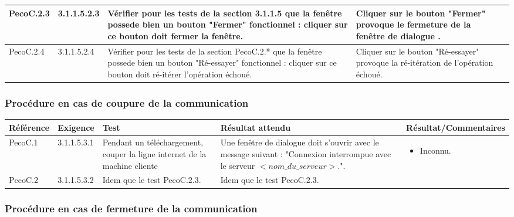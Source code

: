 \documentclass[10pt,a4paper,landscape]{report}
\begin{document}
\begin{center}
\begin{tabular}{|p{2.5cm}|p{2cm}|p{8cm}|p{8cm}|p{5cm}|}
		PecoC.2.3 & 3.1.1.5.2.3 & Vérifier pour les tests de la section 3.1.1.5 que la fenêtre possede bien un bouton "Fermer" fonctionnel :  cliquer sur ce bouton doit fermer la fenêtre.& Cliquer sur le bouton "Fermer" provoque le fermeture de la fenêtre de dialogue .&\\
		\hline
		PecoC.2.4 & 3.1.1.5.2.4 & Vérifier pour les tests de la section PecoC.2.* que la fenêtre possede bien un bouton "Ré-essayer" fonctionnel :  cliquer sur ce bouton doit ré-itérer l'opération échoué.& Cliquer sur le bouton "Ré-essayer" provoque la ré-itération de l'opération échoué.&\\
		\hline
	\end{tabular}
	\egroup
\end{center}

\subsubsection{Procédure en cas de coupure de la communication}

\begin{center}
	\bgroup
	\def\arraystretch{1.5}
	\begin{tabular}{|p{2.5cm}|p{2cm}|p{8cm}|p{8cm}|p{5cm}|}
		\hline
		\rowcolor{gris}Référence & Exigence & Test & Résultat attendu & Résultat/Commentaires\\
		\hline
		PecoC.1 & 3.1.1.5.3.1 & Pendant un téléchargement, couper la ligne internet de la machine cliente & Une fenêtre de dialogue doit s'ouvrir avec le message suivant :   "Connexion interrompue avec le serveur $< nom\_du\_serveur>$.".&\vspace*{-0.2cm} \begin{itemize}[label=$\ast$] \item \textcolor{ukwn}{Inconnu.}\end{itemize} \\
		\hline
		PccoC.2 & 3.1.1.5.3.2 & Idem que le test PecoC.2.3. & Idem que le test PecoC.2.3.\\
		\hline
	\end{tabular}
	\egroup
\end{center}

\subsubsection{Procédure en cas de fermeture de la communication}
\end{document}
